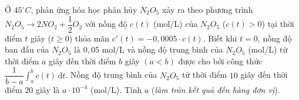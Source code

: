 \begin{bt}%
	Ở $45^\circ C$, phản ứng hóa học phân hủy $N_2O_5$ xảy ra theo phương trình \break$N_2O_5 \to 2NO_2 + \dfrac{1}{2}O_2$ với nồng độ $c(t)$ (mol/L) của $N_2O_5$ ($c(t)  > 0$) tại thời điểm $t$ giây ($t \ge 0$) thỏa mãn $c'(t) = -0{,}0005 \cdot c(t)$. Biết khi $t=0$, nồng độ ban đầu của $N_2O_5$ là $0{,}05$ mol/L và nồng độ trung bình của $N_2O_5$ (mol/L) từ thời điểm $a$ giây đến thời điểm $b$ giây $(a < b)$ được cho bởi công thức $\dfrac{1}{b-a} \displaystyle \int_{a}^{b} c(t) \mathrm{\,d}t$.
	Nồng độ trung bình của $N_2O_5$ từ thời điểm $10$ giây  đến thời điểm $20$ giây là $a \cdot 10^{-4}$ (mol/L). Tính $a$ (\textit{làm tròn kết quả đến hàng đơn vị}).
\end{bt}

